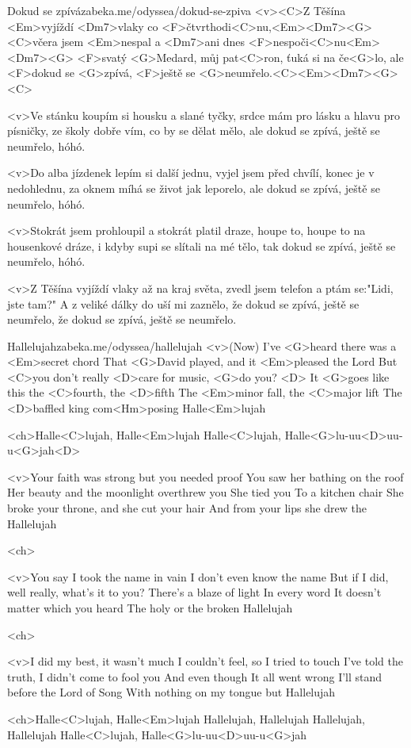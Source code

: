 \begin{song}{5}{Dokud se zpívá}{zabeka.me/odyssea/dokud-se-zpiva}
	<v><C>Z Těšína <Em>vyjíždí <Dm7>vlaky co <F>čtvrthodi<C>nu,<Em><Dm7><G>
	<C>včera jsem <Em>nespal a <Dm7>ani dnes <F>nespoči<C>nu<Em><Dm7><G>
	<F>svatý <G>Medard, můj pat<C>ron, ťuká si na če<G>lo,
	ale <F>dokud se <G>zpívá, <F>ještě se <G>neumřelo.<C><Em><Dm7><G><C>

	<v>Ve stánku koupím si housku a slané tyčky,
	srdce mám pro lásku a hlavu pro písničky,
	ze školy dobře vím, co by se dělat mělo,
	ale dokud se zpívá, ještě se neumřelo, hóhó.


	<v>Do alba jízdenek lepím si další jednu,
	vyjel jsem před chvílí, konec je v nedohlednu,
	za oknem míhá se život jak leporelo,
	ale dokud se zpívá, ještě se neumřelo, hóhó.


	<v>Stokrát jsem prohloupil a stokrát platil draze,
	houpe to, houpe to na housenkové dráze,
	i kdyby supi se slítali na mé tělo,
	tak dokud se zpívá, ještě se neumřelo, hóhó.

	<v>Z Těšína vyjíždí vlaky až na kraj světa,
	zvedl jsem telefon a ptám se:"Lidi, jste tam?"
	A z veliké dálky do uší mi zaznělo,
	že dokud se zpívá, ještě se neumřelo,
	že dokud se zpívá, ještě se neumřelo.
\end{song}
\begin{song}{6}{Hallelujah}{zabeka.me/odyssea/hallelujah}
	<v>(Now) I've <G>heard there was a <Em>secret chord
	That <G>David played, and it <Em>pleased the Lord
	But <C>you don't really <D>care for music, <G>do you? <D>
	It <G>goes like this the <C>fourth, the <D>fifth
	The <Em>minor fall, the <C>major lift
	The <D>baffled king com<Hm>posing Halle<Em>lujah

	<ch>Halle<C>lujah, Halle<Em>lujah
	Halle<C>lujah, Halle<G>lu-uu<D>uu-u<G>jah<D>

	<v>Your faith was strong but you needed proof
	You saw her bathing on the roof
	Her beauty and the moonlight overthrew you
	She tied you
	To a kitchen chair
	She broke your throne, and she cut your hair
	And from your lips she drew the Hallelujah

	<ch>

	<v>You say I took the name in vain
	I don't even know the name
	But if I did, well really, what's it to you?
	There's a blaze of light
	In every word
	It doesn't matter which you heard
	The holy or the broken Hallelujah

	<ch>

	<v>I did my best, it wasn't much
	I couldn't feel, so I tried to touch
	I've told the truth, I didn't come to fool you
	And even though
	It all went wrong
	I'll stand before the Lord of Song
	With nothing on my tongue but Hallelujah

	<ch>Halle<C>lujah, Halle<Em>lujah
	Hallelujah, Hallelujah
	Hallelujah, Hallelujah
	Halle<C>lujah, Halle<G>lu-uu<D>uu-u<G>jah
\end{song}
